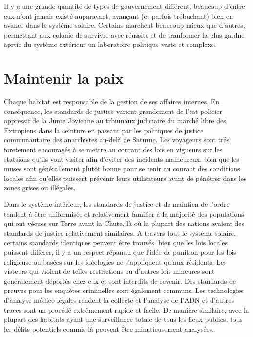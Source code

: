                Il y a une grande quantité de types de gouvernement différent, beaucoup d'entre eux n'ont jamais existé auparavant, avançant (et parfois trébuchant) bien en avance dans le système solaire. Certains marchent beaucoup mieux que d'autres, permettant aux colonie de survivre avec réussite et de tranformer la plus gardne aprtie du système extérieur un laboratoire politique vaste et complexe. 

               \section{Maintenir la paix} \label{sec:keeping-peace} 

               Chaque habitat est responsable de la gestion de ses affaires internes. En conséquence, les standards de justice varient grandement de l'tat policier oppressif de la Junte Jovienne au trbiunaux judiciaire du marché libre des Extropiens dans la ceinture en passant par les politiques de justice communautaire des anarchistes au-delà de Saturne. Les voyageurs sont trés foretement encouragés à se mettre au courant des lois en vigueurs sur les statsions qu'ils vont visiter afin d'éviter des incidents malheureux, bien que les muses sont générallement plutôt bonne pour se tenir au courant des conditions locales afin qu'elles puissent prévenir leurs utilisateurs avant de pénétrer dans les zones grises ou illégales. 

               Dans le système intérieur, les standards de justice et de maintien de l'ordre tendent à être uniformisée et relativement familier à la majorité des populations qui ont vécues sur Terre avant la Chute, là où la plupart des nations avaient des standards de justice relativement similaires. A travers tout le système solaire, certains standards identiques peuvent être trouvés. bien que les lois locales puissent différer, il y a un respect répandu que l'idée de punition pour les lois religieuse ou basées sur les idéologies ne s'appliquent qu'aux résidents. Les visteurs qui violent de telles restrictions ou d'autres lois mineures sont généralement déportés chez eux et sont interdits de revenir. Des standards de preuves pour les enquètes criminelles sont également communs. Les technologies d'analyse médico-légales rendent la collecte et l'analyse de l'ADN et d'autres traces sont un procédé extrêmement rapide et facile. De manière similaire, avec la plupart des habitats ayant une surveillance totale de tous les lieux publics, tous les délits potentiels commis là peuvent être minutieusement analysées. 

